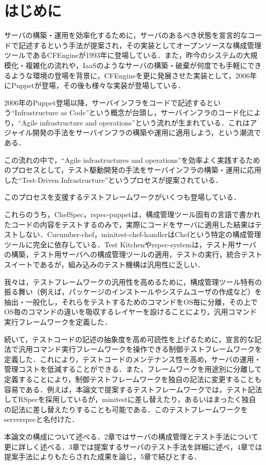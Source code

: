 \section{はじめに}

サーバの構築・運用を効率化するために，サーバのあるべき状態を宣言的なコードで記述するという手法が提案され，その実装としてオープンソースな構成管理ツールであるCFEngine\cite{cfengine}が1993年に登場している．また，昨今のシステムの大規模化・複雑化の流れや，IaaSのようなサーバの構築・破棄が何度でも手軽にできるような環境の登場を背景に，CFEngineを更に発展させた実装として，2006年にPuppet\cite{puppet}が登場，その後も様々な実装が登場している\cite{chef}\cite{saltstack}\cite{ansible}．

2006年のPuppet登場以降，サーバインフラをコードで記述するという``Infrastructure as Code''という概念が台頭し，サーバインフラのコード化により，``Agile infrastructure and operations''\cite{agile infrastructure}という流れが生まれている．これはアジャイル開発の手法をサーバインフラの構築や運用に適用しよう，という潮流である．

この流れの中で，``Agile infrastructures and operations''を効率よく実践するためのプロセスとして，テスト駆動開発の手法をサーバインフラの構築・運用に応用した``Test-Driven Infrastructure''\cite{test driven infrastructure with chef}というプロセスが提案されている．

このプロセスを支援するテストフレームワークがいくつも登場している\cite{chefspec}\cite{rspec-puppet}\cite{cucumber-chef}\cite{minitest-chef-handler}\cite{test kitchen}\cite{rspec-system}．

これらのうち，ChefSpec，rspec-puppetは，構成管理ツール固有の言語で書かれたコードの内容をテストするのみで，実際にコードをサーバに適用した結果はテストしない．Cucumber-chef，minitest-chef-handlerはChefという特定の構成管理ツールに完全に依存している．Test Kitchenやrspec-systemは，テスト用サーバの構築，テスト用サーバへの構成管理ツールの適用，テストの実行，統合テストスイートであるが，組み込みのテスト機構は汎用性に乏しい．

我々は，テストフレームワークの汎用性を高めるために，構成管理ツール特有の振る舞い（例えば，パッケージのインストールやシステムユーザの作成など）を抽出・一般化し，それらをテストするためのコマンドをOS毎に分離，その上でOS毎のコマンドの違いを吸収するレイヤーを設けることにより，汎用コマンド実行フレームワークを定義した．

続いて，テストコードの記述の抽象度を高め可読性を上げるために，宣言的な記法で汎用コマンド実行フレームワークを操作できる制御テストフレームワークを定義した．これにより，テストコードのメンテナンス性を高め，サーバの運用・管理コストを低減することができる．また，フレームワークを用途別に分離して定義することにより，制御テストフレームワークを独自の記法に変更することも容易である．例えば，本論文で提案するテストフレームワークでは，テスト記法してRSpec\cite{rspec}を採用しているが，minitest\cite{minitest}に差し替えたり，あるいはまったく独自の記法に差し替えたりすることも可能である．このテストフレームワークをserverspec\cite{serverspec}と名付けた．

本論文の構成について述べる．2章ではサーバの構成管理とテスト手法について更に詳しく述べる．3章では提案するサーバのテスト手法を詳細に述べ，4章では提案手法によりもたらされた成果を論じ，5章で結びとする．
